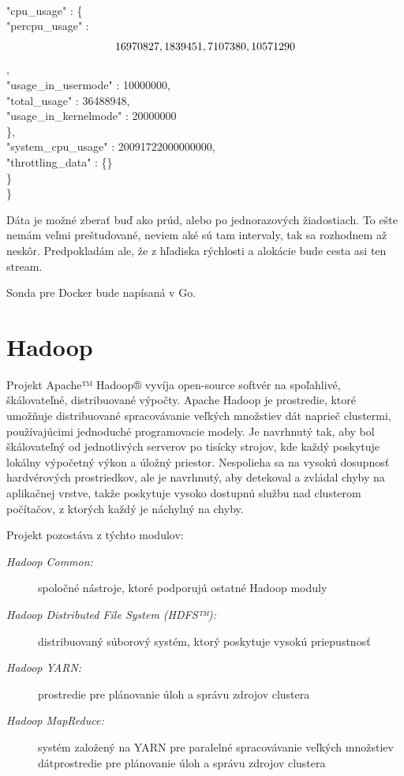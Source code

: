 \documentclass[11pt,final,oneside]{fithesis}
\begin{document}
\\        "cpu_usage" : \{
\\           "percpu_usage" : \[
\\              16970827,
\\              1839451,
\\              7107380,
\\              10571290
\\           \],
\\           "usage_in_usermode" : 10000000,
\\           "total_usage" : 36488948,
\\           "usage_in_kernelmode" : 20000000
\\        \},
\\        "system_cpu_usage" : 20091722000000000,
\\        "throttling_data" : \{\}
\\     \}
\\  \}
  
Dáta je možné zberať buď ako prúd, alebo po jednorazových žiadostiach. To ešte nemám veľmi preštudované, neviem aké sú tam intervaly, tak sa rozhodnem až neskôr.
Predpokladám ale, že z hľadiska rýchlosti a alokácie bude cesta asi ten stream.


Sonda pre Docker bude napísaná v Go.
\section{Hadoop}
Projekt Apache™ Hadoop® vyvíja open-source softvér na spoľahlivé, škálovateľné, distribuované výpočty. Apache Hadoop je prostredie, ktoré umožňuje distribuované spracovávanie veľkých množstiev dát
naprieč clustermi, používajúcimi jednoduché programovacie modely. Je navrhnutý tak, aby bol škálovateľný od jednotlivých serverov po tisícky strojov, kde každý poskytuje lokálny výpočetný výkon a úložný priestor.
Nespolieha sa na vysokú dosupnosť hardvérových prostriedkov, ale je navrhnutý, aby detekoval a zvládal chyby na aplikačnej vrstve, takže poskytuje vysoko dostupnú službu nad clusterom počítačov, z ktorých 
každý je náchylný na chyby.

Projekt pozostáva z týchto modulov:

\begin{description}
\item[\emph{Hadoop Common:}] spoločné nástroje, ktoré podporujú ostatné Hadoop moduly
\item[\emph{Hadoop Distributed File System (HDFS™):}] distribuovaný súborový systém, ktorý poskytuje vysokú priepustnosť
\item[\emph{Hadoop YARN:}] prostredie pre plánovanie úloh a správu zdrojov clustera
\item[\emph{Hadoop MapReduce:}] systém založený na YARN pre paralelné spracovávanie veľkých množstiev dátprostredie pre plánovanie úloh a správu zdrojov clustera
\end{description}
\end{document}
